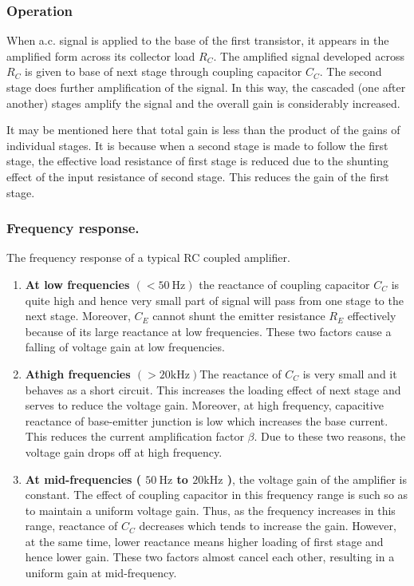 \subsubsection{Operation}
 When a.c. signal is applied to the base of the first transistor, it appears in the amplified form across its collector load $R_{C} .$ The amplified signal developed across $R_{C}$ is given to base of next stage through coupling capacitor $C_{C} .$ The second stage does further amplification of the signal. In this way, the cascaded (one after another) stages amplify the signal and the overall gain is considerably increased.

It may be mentioned here that total gain is less than the product of the gains of individual stages. It is because when a second stage is made to follow the first stage, the effective load resistance of first stage is reduced due to the shunting effect of the input resistance of second stage. This reduces the gain of the first stage.

\subsubsection{Frequency response.} 
The frequency response of a typical RC coupled amplifier.
\begin{enumerate}
	\item \textbf{ At low frequencies $(<50 \mathrm{~Hz})$} the reactance of coupling capacitor $C_{C}$ is quite high and hence very small part of signal will pass from one stage to the next stage. Moreover, $C_{E}$ cannot shunt the emitter resistance $R_{E}$ effectively because of its large reactance at low frequencies. These two factors cause a falling of voltage gain at low frequencies.
	\item \textbf{ Athigh frequencies $(>20 \mathrm{kHz})$}The reactance of $C_{C}$ is very small and it behaves as a short circuit. This increases the loading effect of next stage and serves to reduce the voltage gain. Moreover, at high frequency, capacitive reactance of base-emitter junction is low which increases the base current. This reduces the current amplification factor $\beta$. Due to these two reasons, the voltage gain drops off at high frequency.
	\item \textbf{ At mid-frequencies ( $50 \mathrm{~Hz}$ to $20 \mathrm{kHz}$ )}, the voltage gain of the amplifier is constant. The effect of coupling capacitor in this frequency range is such so as to maintain a uniform voltage gain. Thus, as the frequency increases in this range, reactance of $C_{C}$ decreases which tends to increase the gain. However, at the same time, lower reactance means higher loading of first stage and hence lower gain. These two factors almost cancel each other, resulting in a uniform gain at mid-frequency.
\end{enumerate}

